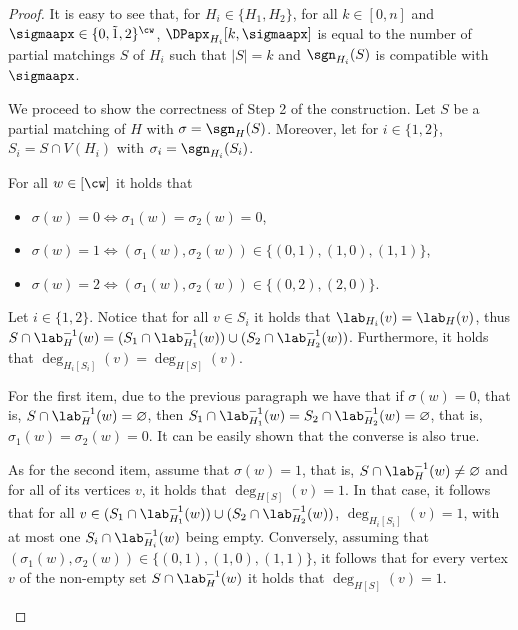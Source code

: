 \begin{proof}
    It is easy to see that, for $H_i \in \{H_1,H_2\}$,
    for all $k \in [0,n]$ and $\sigmaapx \in \{0,\tilde{1},2\}^{\cw}$,
    $\DPapx_{H_i}[k,\sigmaapx]$ is equal to the number of partial matchings $S$ of $H_i$ such that $|S|=k$ and
    $\sgn_{H_i}(S)$ is compatible with $\sigmaapx$.

    We proceed to show the correctness of Step 2 of the construction.
    Let $S$ be a partial matching of $H$ with $\sigma = \sgn_H(S)$.
    Moreover, let for $i \in \{1,2\}$,
    $S_i = S \cap V(H_i)$ with $\sigma_i = \sgn_{H_i}(S_i)$.

    \begin{claim}\label{claim:induced:cw:union-correctness}
        For all $w \in [\cw]$ it holds that
        \begin{itemize}
            \item $\sigma(w)=0 \iff \sigma_1(w)=\sigma_2(w)=0$,
            \item $\sigma(w)=1 \iff (\sigma_1(w),\sigma_2(w)) \in \{(0,1),(1,0),(1,1)\}$,
            \item $\sigma(w)=2 \iff (\sigma_1(w),\sigma_2(w)) \in \{(0,2),(2,0)\}$.
        \end{itemize}
    \end{claim}

    \begin{claimproof}
        Let $i \in \{1,2\}$.
        Notice that for all $v \in S_i$ it holds that
        $\lab_{H_i}(v) = \lab_H(v)$,
        thus $S \cap \lab^{-1}_H(w) =
        (S_1 \cap \lab^{-1}_{H_1}(w)) \cup (S_2 \cap \lab^{-1}_{H_2}(w))$.
        Furthermore, it holds that $\deg_{H_i[S_i]}(v) = \deg_{H[S]}(v)$.

        For the first item, due to the previous paragraph we have that
        if $\sigma(w) = 0$, that is, $S \cap \lab^{-1}_H(w) = \varnothing$,
        then $S_1 \cap \lab^{-1}_{H_1}(w) = S_2 \cap \lab^{-1}_{H_2}(w) = \varnothing$,
        that is, $\sigma_1(w) = \sigma_2(w) = 0$.
        It can be easily shown that the converse is also true.

        As for the second item, assume that $\sigma(w) = 1$, that is, $S \cap \lab^{-1}_H(w) \neq \varnothing$
        and for all of its vertices $v$, it holds that $\deg_{H[S]}(v)=1$.
        In that case, it follows that for all $v \in (S_1 \cap \lab^{-1}_{H_1}(w)) \cup (S_2 \cap \lab^{-1}_{H_2}(w))$,
        $\deg_{H_i[S_i]}(v)=1$, with at most one $S_i \cap \lab^{-1}_{H_i}(w)$ being empty.
        Conversely, assuming that $(\sigma_1(w),\sigma_2(w)) \in \{(0,1),(1,0),(1,1)\}$, it follows that
        for every vertex $v$ of the non-empty set $S \cap \lab^{-1}_H(w)$ it holds that $\deg_{H[S]}(v) = 1$.


\end{claimproof}
\end{proof}
